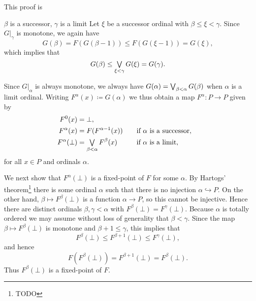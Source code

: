 \documentclass[a4paper, 11pt, article, danish, oneside]{memoir}
\DeclareMathOperator*{\smallbigvee}{\textstyle\bigvee}
\DeclareMathOperator*{\bigjoin}{\mathchoice
    {\smallbigvee}%
    {\bigvee}%
    {\bigvee}%
    {\bigvee}%
}
\newcommand{\defeq}{\coloneqq}
\newcommand{\injto}{\hookrightarrow}
\begin{document}
\begin{prooffootnote}{This proof is }
\begin{proofsec}
        \item[$\beta$ is a successor, $\gamma$ is a limit]
        Let $\xi$ be a successor ordinal with $\beta \leq \xi < \gamma$. Since $G|_\gamma$ is monotone, we again have
        \begin{equation*}
            G(\beta)
                = F(G(\beta-1))
                \leq F(G(\xi-1))
                = G(\xi),
        \end{equation*}
        which implies that
        \begin{equation*}
            G(\beta)
                \leq \bigjoin_{\xi < \gamma} G(\xi)
                = G(\gamma).
        \end{equation*}
    \end{proofsec}
    Since $G|_\alpha$ is always monotone, we always have $G(\alpha) = \bigjoin_{\beta < \alpha} G(\beta)$ when $\alpha$ is a limit ordinal. Writing $F^\alpha(x) \defeq G(\alpha)$ we thus obtain a map $F^\alpha \colon P \to P$ given by
    \begin{alignat*}{2}
        F^0(x)
            &= \bot, \\
        F^{\alpha}(x)
            &= F(F^{\alpha-1}(x))
            \quad &&\text{if $\alpha$ is a successor}, \\
        F^\alpha(\bot)
            &= \bigjoin_{\beta < \alpha} F^\beta(x)
            \quad &&\text{if $\alpha$ is a limit},
    \end{alignat*}
    for all $x \in P$ and ordinals $\alpha$.

    We next show that $F^\alpha(\bot)$ is a fixed-point of $F$ for some $\alpha$. By Hartogs' theorem\footnote{TODO} there is some ordinal $\alpha$ such that there is no injection $\alpha \injto P$. On the other hand, $\beta \mapsto F^\beta(\bot)$ is a function $\alpha \to P$, so this cannot be injective. Hence there are distinct ordinals $\beta,\gamma < \alpha$ with $F^\beta(\bot) = F^\gamma(\bot)$. Because $\alpha$ is totally ordered we may assume without loss of generality that $\beta < \gamma$. Since the map $\beta \mapsto F^\beta(\bot)$ is monotone and $\beta + 1 \leq \gamma$, this implies that
    \begin{equation*}
        F^\beta(\bot)
            \leq F^{\beta+1}(\bot)
            \leq F^\gamma(\bot),
    \end{equation*}
    and hence
    \begin{equation*}
        F(F^\beta(\bot))
            = F^{\beta+1}(\bot)
            = F^\beta(\bot).
    \end{equation*}
    Thus $F^\beta(\bot)$ is a fixed-point of $F$.


\end{prooffootnote}
\end{document}
